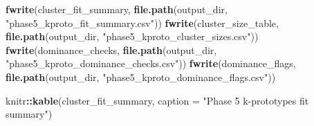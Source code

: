 \documentclass[
]{article}
\newenvironment{Shaded}{\begin{snugshade}}{\end{snugshade}}
\newcommand{\AttributeTok}[1]{\textcolor[rgb]{0.13,0.29,0.53}{#1}}
\newcommand{\FunctionTok}[1]{\textcolor[rgb]{0.13,0.29,0.53}{\textbf{#1}}}
\newcommand{\NormalTok}[1]{#1}
\newcommand{\SpecialCharTok}[1]{\textcolor[rgb]{0.81,0.36,0.00}{\textbf{#1}}}
\newcommand{\StringTok}[1]{\textcolor[rgb]{0.31,0.60,0.02}{#1}}
\begin{document}
\begin{Shaded}
\begin{Highlighting}[]
\FunctionTok{fwrite}\NormalTok{(cluster\_fit\_summary, }\FunctionTok{file.path}\NormalTok{(output\_dir, }\StringTok{"phase5\_kproto\_fit\_summary.csv"}\NormalTok{))}
\FunctionTok{fwrite}\NormalTok{(cluster\_size\_table, }\FunctionTok{file.path}\NormalTok{(output\_dir, }\StringTok{"phase5\_kproto\_cluster\_sizes.csv"}\NormalTok{))}
\FunctionTok{fwrite}\NormalTok{(dominance\_checks, }\FunctionTok{file.path}\NormalTok{(output\_dir, }\StringTok{"phase5\_kproto\_dominance\_checks.csv"}\NormalTok{))}
\FunctionTok{fwrite}\NormalTok{(dominance\_flags, }\FunctionTok{file.path}\NormalTok{(output\_dir, }\StringTok{"phase5\_kproto\_dominance\_flags.csv"}\NormalTok{))}

\NormalTok{knitr}\SpecialCharTok{::}\FunctionTok{kable}\NormalTok{(cluster\_fit\_summary, }\AttributeTok{caption =} \StringTok{"Phase 5 k{-}prototypes fit summary"}\NormalTok{)}
\end{Highlighting}
\end{Shaded}
\end{document}
